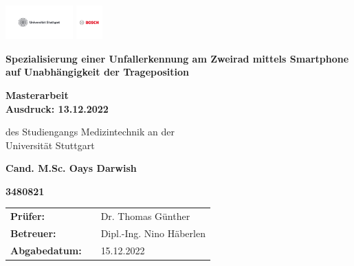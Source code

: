 \relax
\begin{center}
	\begin{center}
			\includegraphics[height=1.3cm]{Bilder/Logos/unistuttgart_logo_deutsch2.pdf} \hfill \includegraphics[height=1.3cm]{Bilder/Logos/BoschLogotype2.pdf}
	\end{center}
	\vspace*{2.5cm} 
	\begin{center}
		\LARGE\textbf{Spezialisierung einer Unfallerkennung am Zweirad mittels Smartphone auf Unabhängigkeit der Trageposition}
	\end{center}
	\vspace{2.5cm}
	
	\begin{center}
		\textbf{Masterarbeit\\Ausdruck: 13.12.2022}
	\end{center}
	\vspace{1cm}
	
	\begin{center}
		des Studiengangs Medizintechnik an der\\
		Universität Stuttgart
	\end{center}
	\vspace{1.8cm}
	\begin{center}
		\textbf{Cand. M.Sc. Oays Darwish} 
	\end{center}	
	
	\begin{center}
		\textbf{3480821}
	\end{center}
	\vspace{2.5cm}
	\begin{center}
		\begin{tabular}{lll}
			\textbf{Prüfer: }&& Dr. Thomas Günther\\
			\textbf{Betreuer:}&& Dipl.-Ing. Nino Häberlen \\
			\textbf{Abgabedatum: }&& 15.12.2022\\
		\end{tabular}
	\end{center}	
	
\end{center}